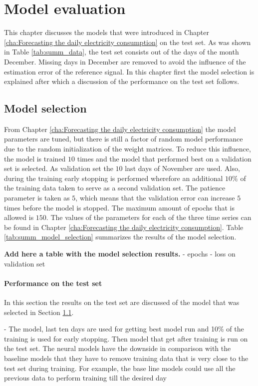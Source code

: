 \chapter{Model evaluation}
\label{cha:Model evaluation}

This chapter discusses the models that were introduced in Chapter \ref{cha:Forecasting the daily electricity consumption} on the test set. As was shown in Table \ref{tab:summ_data}, the test set consists out of the days of the month December. Missing days in December are removed to avoid the influence of the estimation error of the reference signal. In this chapter first the model selection is explained after which a discussion of the performance on the test set follows.

\section{Model selection}\label{s:Model selection}
From Chapter \ref{cha:Forecasting the daily electricity consumption} the model parameters are tuned, but there is still a factor of random model performance due to the random initialization of the weight matrices. To reduce this influence, the model is trained $ 10 $ times and the model that performed best on a validation set is selected. As validation set the $ 10 $ last days of November are used. Also, during the training early stopping is performed wherefore an additional $ 10\% $ of the training data taken to serve as a second validation set. The patience parameter is taken as $ 5 $, which means that the validation error can increase $ 5 $ times before the model is stopped. The maximum amount of epochs that is allowed is $ 150 $. The values of the parameters for each of the three time series can be found in Chapter \ref{cha:Forecasting the daily electricity consumption}. Table \ref{tab:summ_model_selection} summarizes the results of the model selection. 

\textbf{Add here a table with the model selection results.}
- epochs
- loss on validation set




\subsubsection{Performance on the test set}
In this section the results on the test set are discussed of the model that was selected in Section \ref{s:Model selection}.

- The model, last ten days are used for getting best model run and 10\% of the training is used for early stopping. Then model that get after training is run on the test set. The neural models have the downside in comparison with the baseline models that they have to remove training data that is very close to the test set during training. For example, the base line models could use all the previous data to perform training till the desired day

